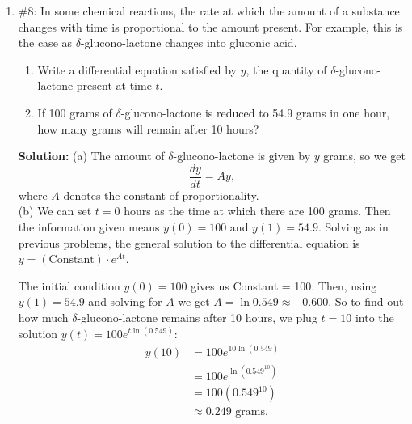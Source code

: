 \documentclass[11pt,letterpaper]{article}
\begin{document}
\begin{enumerate}
{\bf Solution:} (a) This problem is similar to earlier ones, except we only have information for the first 20 years:
\[\frac{dB}{dt}=0.05B-12000\quad\text{ for }0\leq t\leq20\] 
(b) Solving as before,
\[B=(\text{Constant})\cdot e^{0.05t}+240000\quad\text{ for }0\leq t\leq20\]
and we use the initial condition $B(0)=B_0$ to get
\begin{align*}
B_0 &= \text{Constant}+240000 \\
B_0-240000 &=\text{Constant}.
\end{align*}
The solution is
\[B(t)=(B_0-240000)e^{0.05t}+240000\quad\text{ for }0\leq t\leq20.\]
(c) We must solve for $B_0$, given $B(20)=0$:
\begin{align*}
0 &= (B_0-240000)e^{0.05(20)}+240000 \\
\frac{-240000}{e^{0.05(20)}}+240000 &= B_0 \\
B_0 &\approx \$151,708.93.
\end{align*}

\item \#8: In some chemical reactions, the rate at which the amount of a substance changes with time is proportional to the amount present.  For example, this is the case as $\delta$-glucono-lactone changes into gluconic acid.
\begin{enumerate}
\item Write a differential equation satisfied by $y$, the quantity of $\delta$-glucono-lactone present at time $t$.
\item If 100 grams of $\delta$-glucono-lactone is reduced to 54.9 grams in one hour, how many grams will remain after 10 hours?
\end{enumerate}

{\bf Solution:} (a) The amount of $\delta$-glucono-lactone is given by $y$ grams, so we get
\[\frac{dy}{dt}=Ay,\]
where $A$ denotes the constant of proportionality. \\  
(b) We can set $t=0$ hours as the time at which there are 100 grams.  Then the information given means $y(0)=100$ and $y(1)=54.9$.  Solving as in previous problems, the general solution to the differential equation is $y=(\text{Constant})\cdot e^{At}$.

The initial condition $y(0)=100$ gives us Constant = 100.  Then, using $y(1)=54.9$ and solving for $A$ we get $A=\ln{0.549}\approx -0.600$.  So to find out how much $\delta$-glucono-lactone remains after 10 hours, we plug $t=10$ into the solution $y(t)=100e^{t\ln(0.549)}$:
\begin{align*}
y(10) &= 100e^{10\ln(0.549)} \\
&= 100e^{\ln(0.549^{10})} \\
&= 100(0.549^{10}) \\
&\approx 0.249 \text{ grams.}
\end{align*}


\end{enumerate}
\end{document}
